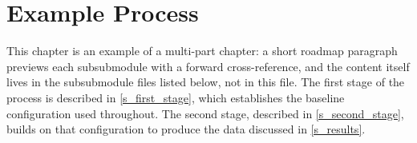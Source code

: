 \chapter{Example Process}%
\label{s_example_process}

This chapter is an example of a multi-part chapter: a short roadmap
paragraph previews each subsubmodule with a forward cross-reference, and
the content itself lives in the subsubmodule files listed below, not in
this file. The first stage of the process is described in
\cref{s_first_stage}, which establishes the baseline configuration used
throughout. The second stage, described in \cref{s_second_stage}, builds
on that configuration to produce the data discussed in
\cref{s_results}.



